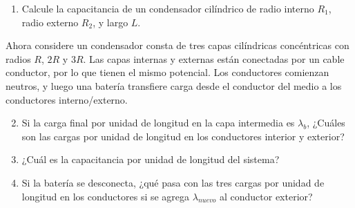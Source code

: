\begin{enumerate}[label=\alph*)]
    \item Calcule la capacitancia de un condensador cilíndrico de radio interno $R_1$, radio externo $R_2$, y largo $L$.
\end{enumerate}

Ahora considere un condensador consta de tres capas cilíndricas concéntricas con radios $R$, $2R$ y $3R$. Las capas internas y externas están conectadas por un cable conductor, por lo que tienen el mismo potencial. Los conductores comienzan neutros, y luego una batería transfiere carga desde el conductor del medio a los conductores interno/externo.

\begin{enumerate}[label=\alph*)]\setcounter{enumi}{1}
    \item Si la carga final por unidad de longitud en la capa intermedia es $\lambda_b$, ¿Cuáles son las cargas por unidad de longitud en los conductores interior y exterior?
    \item ¿Cuál es la capacitancia por unidad de longitud del sistema?
    \item Si la batería se desconecta, ¿qué pasa con las tres cargas por unidad de longitud en los conductores si se agrega $\lambda_{nuevo}$ al conductor exterior?
\end{enumerate}

\newpage